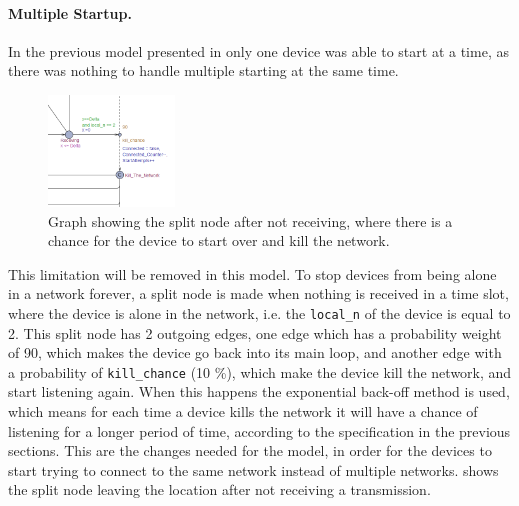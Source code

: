 \paragraph{Multiple Startup.}
In the previous model presented in  only one device was able to start at a time, as there was nothing to handle multiple starting at the same time.
\begin{figure}
\centering
  \includegraphics[width=0.3\textwidth]{Figures/Model/Screenshot_Of_Kill.png} 
\caption{Graph showing the split node after not receiving, where there is a chance for the device to start over and kill the network.}
\label{fig:Screenshot_Of_Kill}
\end{figure}

This limitation will be removed in this model.
To stop devices from being alone in a network forever, a split node is made when nothing is received in a time slot, where the device is alone in the network, i.e. the \texttt{local\_n} of the device is equal to 2.
This split node has 2 outgoing edges, one edge which has a probability weight of 90, which makes the device go back into its main loop, and another edge with a probability of \texttt{kill\_chance} (10 \%), which make the device kill the network, and start listening again.
When this happens the exponential back-off method is used, which means for each time a device kills the network it will have a chance of listening for a longer period of time, according to the specification in the previous sections.
This are the changes needed for the model, in order for the devices to start trying to connect to the same network instead of multiple networks.
 shows the split node leaving the location after not receiving a transmission.



